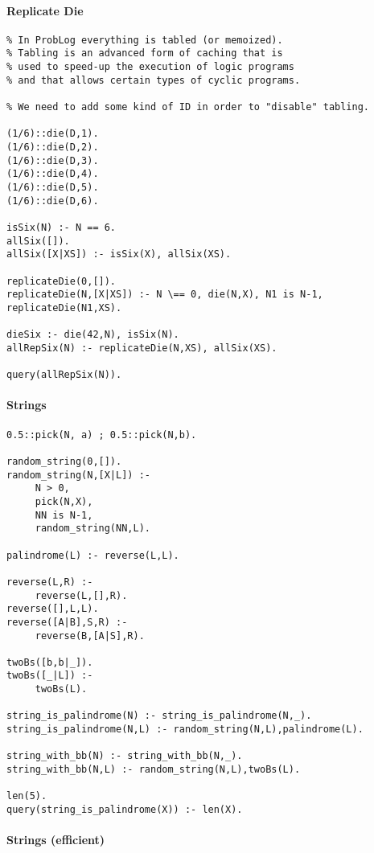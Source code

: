 \paragraph{Replicate Die}
\begin{verbatim}
% In ProbLog everything is tabled (or memoized).
% Tabling is an advanced form of caching that is
% used to speed-up the execution of logic programs
% and that allows certain types of cyclic programs.

% We need to add some kind of ID in order to "disable" tabling.
  
(1/6)::die(D,1).
(1/6)::die(D,2).
(1/6)::die(D,3).
(1/6)::die(D,4).
(1/6)::die(D,5).
(1/6)::die(D,6).

isSix(N) :- N == 6.
allSix([]).
allSix([X|XS]) :- isSix(X), allSix(XS).

replicateDie(0,[]).
replicateDie(N,[X|XS]) :- N \== 0, die(N,X), N1 is N-1, replicateDie(N1,XS).

dieSix :- die(42,N), isSix(N).
allRepSix(N) :- replicateDie(N,XS), allSix(XS).

query(allRepSix(N)).
\end{verbatim}

\paragraph{Strings}
\begin{verbatim}
0.5::pick(N, a) ; 0.5::pick(N,b).

random_string(0,[]).
random_string(N,[X|L]) :-
     N > 0,
     pick(N,X),
     NN is N-1,
     random_string(NN,L).

palindrome(L) :- reverse(L,L).

reverse(L,R) :-
     reverse(L,[],R).
reverse([],L,L).
reverse([A|B],S,R) :-
     reverse(B,[A|S],R).

twoBs([b,b|_]).
twoBs([_|L]) :-
     twoBs(L).

string_is_palindrome(N) :- string_is_palindrome(N,_).
string_is_palindrome(N,L) :- random_string(N,L),palindrome(L).

string_with_bb(N) :- string_with_bb(N,_).
string_with_bb(N,L) :- random_string(N,L),twoBs(L).

len(5).
query(string_is_palindrome(X)) :- len(X).
\end{verbatim}

\paragraph{Strings (efficient)}

